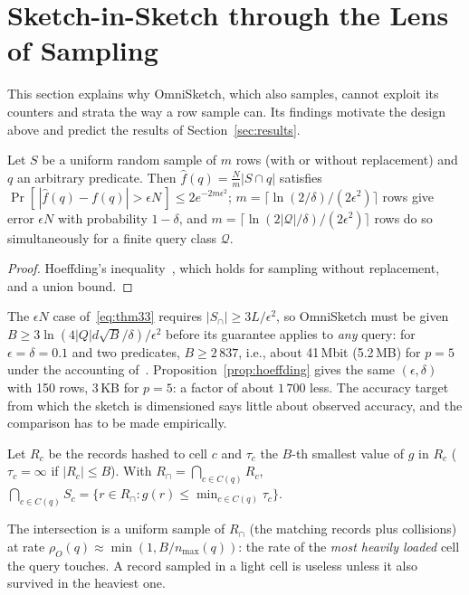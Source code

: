 \documentclass[sigconf]{acmart}
\newcommand{\omni}{OmniSketch\xspace}
\begin{document}
\section{Sketch-in-Sketch through the Lens of Sampling}\label{sec:anatomy}

This section explains why \omni, which also samples, cannot exploit its counters and strata the way a row
sample can. Its findings motivate the design above and predict the results of Section~\ref{sec:results}.

\begin{proposition}\label{prop:hoeffding}
Let $S$ be a uniform random sample of $m$ rows (with or without replacement) and $q$ an arbitrary
predicate. Then $\hat f(q)=\frac{N}{m}|S\cap q|$ satisfies
$\Pr[\,|\hat f(q)-f(q)|>\epsilon N\,]\le 2e^{-2m\epsilon^2}$; $m=\lceil\ln(2/\delta)/(2\epsilon^2)\rceil$ rows
give error $\epsilon N$ with probability $1-\delta$, and $m=\lceil\ln(2|\mathcal Q|/\delta)/(2\epsilon^2)\rceil$
rows do so simultaneously for a finite query class $\mathcal Q$.
\end{proposition}
\begin{proof}
Hoeffding's inequality~\cite{hoeffding}, which holds for sampling without replacement, and a union bound.
\end{proof}
The $\epsilon N$ case of~\eqref{eq:thm33} requires $|S_\cap|\ge3L/\epsilon^2$, so \omni must be given
$B\ge 3\ln(4|Q|d\sqrt B/\delta)/\epsilon^2$ before its guarantee applies to \emph{any} query: for
$\epsilon=\delta=0.1$ and two predicates, $B\ge 2\,837$, i.e., about 41\,Mbit (5.2\,MB) for $p=5$ under the
accounting of~\cite{omni}. Proposition~\ref{prop:hoeffding} gives the same $(\epsilon,\delta)$ with 150
rows, 3\,KB for $p=5$: a factor of about $1\,700$ less. The accuracy target from which the sketch is
dimensioned says little about observed accuracy, and the comparison has to be made empirically.

\begin{observation}\label{obs:min}
Let $R_c$ be the records hashed to cell $c$ and $\tau_c$ the $B$-th smallest value of $g$ in $R_c$
($\tau_c=\infty$ if $|R_c|\le B$). With $R_\cap=\bigcap_{c\in C(q)}R_c$,
$\bigcap_{c\in C(q)} S_c = \{ r\in R_\cap : g(r)\le \min_{c\in C(q)}\tau_c \}$.
\end{observation}
The intersection is a uniform sample of $R_\cap$ (the matching records plus collisions) at rate
$\rho_O(q)\approx\min(1, B/n_{\max}(q))$: the rate of the \emph{most heavily loaded} cell the query touches.
A record sampled in a light cell is useless unless it also survived in the heaviest one.
\end{document}
